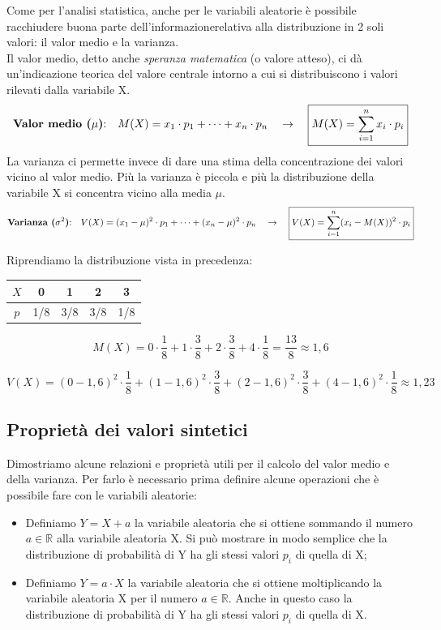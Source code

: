Come per l'analisi statistica, anche per le variabili aleatorie è possibile racchiudere buona parte dell'informazionerelativa alla distribuzione in 2 soli valori: il valor medio e la varianza.\\
Il valor medio, detto anche \emph{speranza matematica} (o valore atteso), ci dà un'indicazione teorica del valore centrale intorno a cui si distribuiscono i valori rilevati dalla variabile X. 
\[\text{\textbf{Valor medio (\(\mu\))}:} \quad M(X) = x_1 \cdot p_1+\dots + x_n \cdot p_n  \quad \rightarrow \quad \boxed{M(X) = \sum_{i = 1}^n x_i \cdot p_i}\]
La varianza ci permette invece di dare una stima della concentrazione dei valori vicino al valor medio. Più la varianza è piccola e più la distribuzione della variabile X si concentra vicino alla media \(\mu\).
\[\text{\textbf{Varianza (\(\sigma^2\))}:} \quad V(X) = (x_1-\mu)^2 \cdot p_1+\dots + (x_n-\mu)^2 \cdot p_n  \quad \rightarrow \quad \boxed{V(X) = \sum_{i = 1}^n (x_i-M(X))^2 \cdot p_i}\]
\begin{esempio} Riprendiamo la distribuzione vista in precedenza:\\[4pt]

\begin{minipage}[r]{.4\textwidth}
\renewcommand\arraystretch{1.4}
\setlength\arraycolsep{25pt}
 \quad \begin{tabular}{c|c|c|c|c}
\(X\) & 0 & 1 & 2 & 3\\
\hline
\(p\) & 1/8 & 3/8 & 3/8 & 1/8
\end{tabular}
\end{minipage}\hfil
\begin{minipage}[c]{.55\textwidth}
\[ M(X) = 0\cdot \dfrac{1}{8}+1\cdot \dfrac{3}{8}+2\cdot \dfrac{3}{8}+4\cdot \dfrac{1}{8} = \dfrac{13}{8} \approx 1,6\]
\end{minipage}
\[ V(X) = (0-1,6)^2\cdot \dfrac{1}{8}+(1-1,6)^2\cdot \dfrac{3}{8}+(2-1,6)^2\cdot \dfrac{3}{8}+(4-1,6)^2\cdot \dfrac{1}{8} \approx 1,23\]
\end{esempio}

\subsection{Proprietà dei valori sintetici}

 Dimostriamo alcune relazioni e proprietà utili per il calcolo del valor medio e della varianza. Per farlo è necessario prima definire alcune operazioni che è possibile fare con le variabili aleatorie:
 \begin{itemize}
 \item Definiamo \(Y = X+a\) la variabile aleatoria che si ottiene sommando il numero \(a\in \mathbb{R}\) alla variabile aleatoria X. Si può mostrare in modo semplice che la distribuzione di probabilità di Y ha gli stessi valori \(p_i\) di quella di X;
 \item Definiamo \(Y = a\cdot X\) la variabile aleatoria che si ottiene moltiplicando la variabile aleatoria X per il numero \(a\in \mathbb{R}\). Anche in questo caso la distribuzione di probabilità di Y ha gli stessi valori \(p_i\) di quella di X.
 \end{itemize}
 
